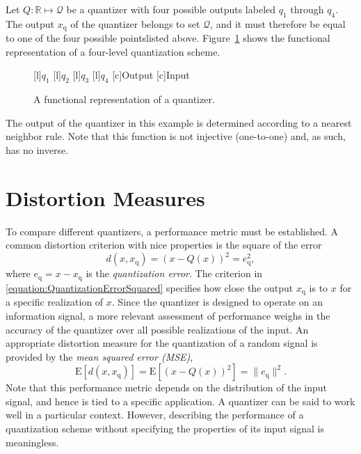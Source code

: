 \begin{example}
Let $Q : \mathbb{R} \mapsto \mathcal{Q}$ be a quantizer with four possible outputs labeled $q_1$ through $q_4$.
The output $x_{\mathrm{q}}$ of the quantizer belongs to set $\mathcal{Q}$, and it must therefore be equal to one of the four possible pointslisted above.
Figure~\ref{figure:Quantizer} shows the functional representation of a four-level quantization scheme.
\begin{figure}[htbp]
\begin{center}
\begin{psfrags}
[l]{$q_1$}
[l]{$q_2$}
[l]{$q_3$}
[l]{$q_4$}
[c]{Output}
[c]{Input}
\end{psfrags}
\caption{A functional representation of a quantizer.}
\label{figure:Quantizer}
\end{center}
\end{figure}

The output of the quantizer in this example is determined according to a nearest neighbor rule.
Note that this function is not injective (one-to-one) and, as such, has no inverse.
\end{example}


\section{Distortion Measures}

To compare different quantizers, a performance metric must be established.
A common distortion criterion with nice properties is the square of the error
\begin{equation} \label{equation:QuantizationErrorSquared}
d(x, x_{\mathrm{q}}) = (x - Q(x))^2 = e_{\mathrm{q}}^2 ,
\end{equation}
where $e_{\mathrm{q}} = x - x_{\mathrm{q}}$ is the \emph{quantization error}.
The criterion in \eqref{equation:QuantizationErrorSquared} specifies how close the output $x_{\mathrm{q}}$ is to $x$ for a specific realization of $x$.
Since the quantizer is designed to operate on an information signal, a more relevant assessment of performance weighs in the accuracy of the quantizer over all possible realizations of the input.
An appropriate distortion measure for the quantization of a random signal is provided by the \emph{mean squared error (MSE)},
\begin{equation} \label{equation:QuantizationMSE}
\mathrm{E} [ d(x, x_{\mathrm{q}}) ]
= \mathrm{E} [(x - Q(x))^2 ] = \| e_{\mathrm{q}} \|^2 .
\end{equation}
Note that this performance metric depends on the distribution of the input signal, and hence is tied to a specific application.
A quantizer can be said to work well in a particular context.
However, describing the performance of a quantization scheme without specifying the properties of its input signal is meaningless.

